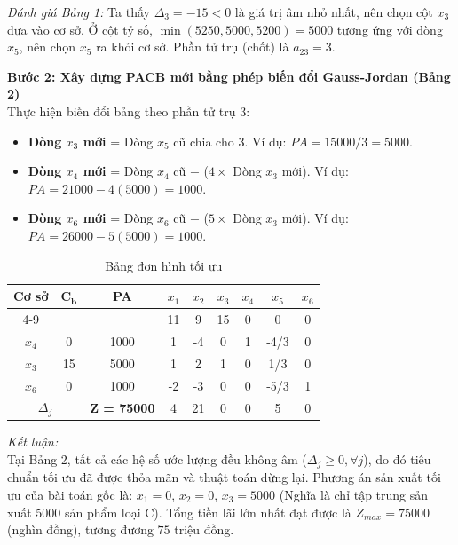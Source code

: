 \textit{Đánh giá Bảng 1:} 
Ta thấy $\Delta_3 = -15 < 0$ là giá trị âm nhỏ nhất, nên chọn cột $x_3$ đưa vào cơ sở. Ở cột tỷ số, $\min(5250, 5000, 5200) = 5000$ tương ứng với dòng $x_5$, nên chọn $x_5$ ra khỏi cơ sở. Phần tử trụ (chốt) là $a_{23} = 3$.

\vspace{0.3cm}
\textbf{Bước 2: Xây dựng PACB mới bằng phép biến đổi Gauss-Jordan (Bảng 2)} \\
Thực hiện biến đổi bảng theo phần tử trụ $3$:
\begin{itemize}
    \item \textbf{Dòng $x_3$ mới} = Dòng $x_5$ cũ chia cho $3$. Ví dụ: $PA = 15000/3 = 5000$.
    \item \textbf{Dòng $x_4$ mới} = Dòng $x_4$ cũ $-$ ($4 \times$ Dòng $x_3$ mới). Ví dụ: $PA = 21000 - 4(5000) = 1000$.
    \item \textbf{Dòng $x_6$ mới} = Dòng $x_6$ cũ $-$ ($5 \times$ Dòng $x_3$ mới). Ví dụ: $PA = 26000 - 5(5000) = 1000$.
\end{itemize}

\begin{table}[htbp]
    \centering
    \renewcommand{\arraystretch}{1.3}
    \begin{tabular}{|c|c|c|c|c|c|c|c|c|}
        \hline
        \multirow{2}{*}{\textbf{Cơ sở}} & \multirow{2}{*}{$\mathbf{C_b}$} & \multirow{2}{*}{\textbf{PA}} & $x_1$ & $x_2$ & $x_3$ & $x_4$ & $x_5$ & $x_6$ \\
        \cline{4-9}
        & & & 11 & 9 & 15 & 0 & 0 & 0 \\
        \hline
        $x_4$ & 0 & 1000 & 1 & -4 & 0 & 1 & -4/3 & 0 \\
        \hline
        $x_3$ & 15 & 5000 & 1 & 2 & 1 & 0 & 1/3 & 0 \\
        \hline
        $x_6$ & 0 & 1000 & -2 & -3 & 0 & 0 & -5/3 & 1 \\
        \hline
        \multicolumn{2}{|c|}{$\Delta_j$} & \textbf{Z = 75000} & 4 & 21 & 0 & 0 & 5 & 0 \\
        \hline
    \end{tabular}
    \caption{Bảng đơn hình tối ưu}
\end{table}

\textit{Kết luận:} \\
Tại Bảng 2, tất cả các hệ số ước lượng đều không âm ($\Delta_j \ge 0, \forall j$), do đó tiêu chuẩn tối ưu đã được thỏa mãn và thuật toán dừng lại. 
Phương án sản xuất tối ưu của bài toán gốc là: $x_1 = 0$, $x_2 = 0$, $x_3 = 5000$ (Nghĩa là chỉ tập trung sản xuất 5000 sản phẩm loại C). 
Tổng tiền lãi lớn nhất đạt được là $Z_{max} = 75000$ (nghìn đồng), tương đương $75$ triệu đồng.

